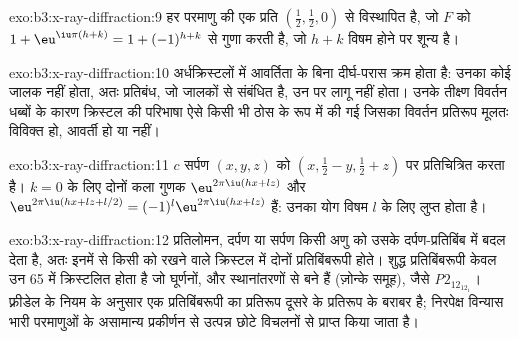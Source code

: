 \begin{solution}{exo:b3:x-ray-diffraction:9}
हर परमाणु की एक प्रति $(\frac12,\frac12,0)$ से विस्थापित है, जो $F$ को $1 +
\eu^{\iu\pi(h+k)} = 1 + (-1)^{h+k}$ से गुणा करती है, जो $h + k$ विषम होने पर शून्य है।
\end{solution}

\begin{solution}{exo:b3:x-ray-diffraction:10}
अर्धक्रिस्टलों में आवर्तिता के बिना दीर्घ-परास क्रम होता है: उनका कोई
जालक नहीं होता, अतः प्रतिबंध, जो जालकों से संबंधित है, उन पर लागू नहीं होता।
उनके तीक्ष्ण विवर्तन धब्बों के कारण क्रिस्टल की परिभाषा ऐसे किसी भी ठोस के रूप में की गई
जिसका विवर्तन प्रतिरूप मूलतः विविक्त हो, आवर्ती हो या नहीं।
\end{solution}

\begin{solution}{exo:b3:x-ray-diffraction:11}
$c$ सर्पण $(x, y, z)$ को $(x, \frac12 - y, \frac12 + z)$ पर प्रतिचित्रित करता है। $k = 0$ के लिए दोनों
कला गुणक $\eu^{2\pi\iu(hx + lz)}$ और $\eu^{2\pi\iu(hx + lz + l/2)} = (-1)^l
\eu^{2\pi\iu(hx+lz)}$ हैं: उनका योग विषम $l$ के लिए लुप्त होता है।
\end{solution}

\begin{solution}{exo:b3:x-ray-diffraction:12}
प्रतिलोमन, दर्पण या सर्पण किसी अणु को उसके दर्पण-प्रतिबिंब में बदल देता है, अतः
इनमें से किसी को रखने वाले क्रिस्टल में दोनों प्रतिबिंबरूपी होते। शुद्ध प्रतिबिंबरूपी
केवल उन 65  में क्रिस्टलित होता है जो घूर्णनों, 
और स्थानांतरणों से बने हैं (ज़ोन्के समूह), जैसे \textit{P}$2_12_12_1$। फ़्रीडेल के नियम के अनुसार
एक प्रतिबिंबरूपी का प्रतिरूप दूसरे के प्रतिरूप के बराबर है; निरपेक्ष
विन्यास भारी परमाणुओं के असामान्य प्रकीर्णन से उत्पन्न छोटे विचलनों से
प्राप्त किया जाता है।
\end{solution}

